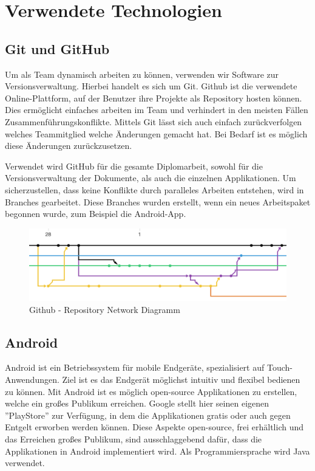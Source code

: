 \chapter{Verwendete Technologien}
\section{Git und GitHub}
Um als Team dynamisch arbeiten zu können, verwenden wir Software zur Versionsverwaltung. Hierbei handelt es sich um Git. 
Github ist die verwendete Online-Plattform, auf der Benutzer ihre Projekte als Repository hosten können. Dies ermöglicht einfaches arbeiten im Team und verhindert in den meisten Fällen Zusammenführungskonflikte. Mittels Git lässt sich auch einfach zurückverfolgen welches Teammitglied welche Änderungen gemacht hat. Bei Bedarf ist es möglich diese Änderungen zurückzusetzen.

Verwendet wird GitHub für die gesamte Diplomarbeit, sowohl für die Versionsverwaltung der Dokumente, als auch die einzelnen Applikationen. Um sicherzustellen, dass keine Konflikte durch paralleles Arbeiten entstehen, wird in Branches gearbeitet. Diese Branches wurden erstellt, wenn ein neues Arbeitspaket begonnen wurde, zum Beispiel die Android-App.

\begin{figure}[H]
\centering
\includegraphics[width=1\textwidth]{images/04_VerwendeteTechnologien/network.png}
\caption{Github - Repository Network Diagramm}
\label{img:githubnetwork}
\end{figure}


\section{Android}

Android ist ein Betriebssystem für mobile Endgeräte, spezialisiert auf Touch-Anwendungen. Ziel ist es das Endgerät möglichst intuitiv und flexibel bedienen zu können. Mit Android ist es möglich open-source Applikationen zu erstellen, welche ein großes Publikum erreichen. Google stellt hier seinen eigenen ''PlayStore'' zur Verfügung, in dem die Applikationen gratis oder auch gegen Entgelt erworben werden können.
Diese Aspekte open-source, frei erhältlich und das Erreichen großes Publikum, sind ausschlaggebend dafür, dass die Applikationen in Android implementiert wird. Als Programmiersprache wird Java verwendet.
\\

